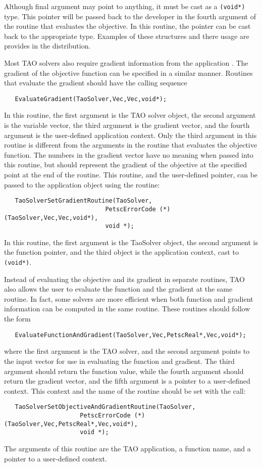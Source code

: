 Although final argument may point to anything, it must be cast as a {\tt (void*)} type.
This pointer will be passed back to the developer in the fourth argument of the
routine that evaluates the objective.  In this routine, the pointer can be cast
back to the appropriate type.  Examples of these structures and there usage
are provides in the distribution.


   Most TAO solvers also require gradient information from the 
application .
  The gradient of the objective function can be specified in a similar manner.
Routines that evaluate the gradient should have the calling sequence
\begin{verbatim}
   EvaluateGradient(TaoSolver,Vec,Vec,void*);
\end{verbatim}
\noindent
In this routine, the first
argument is the TAO solver object, the second argument is the variable
vector, the third argument is the gradient vector, and the fourth argument is
the user-defined application context.  Only the third argument in this
routine is different from the arguments in the routine that evaluates
the objective function.  The numbers in the gradient vector have no
meaning when passed into this routine, but should represent the gradient
of the objective at the specified point at the end of the routine.
This routine, and the user-defined pointer, can be passed to the application
object using the routine: 
\begin{verbatim}
   TaoSolverSetGradientRoutine(TaoSolver,
                            PetscErrorCode (*)(TaoSolver,Vec,Vec,void*),
                            void *);
\end{verbatim}
\noindent
In this routine, the first argument is the TaoSolver object, the second argument
is the function pointer, and the third object is the application context, cast
to {\tt (void*)}.

   Instead of evaluating the objective and its gradient in separate
routines, TAO also allows the user to evaluate the function and the gradient
at the same routine.  In fact, some solvers are more efficient when
both function and gradient information can be computed in the same routine.
These routines should follow the form
\begin{verbatim}
   EvaluateFunctionAndGradient(TaoSolver,Vec,PetscReal*,Vec,void*);
\end{verbatim}
\noindent
where the first
argument is the TAO solver, and the second
argument points to the input vector for use in evaluating the
function and gradient. The third argument should return the
function value, while the fourth argument should return the gradient vector,
and the fifth argument is a pointer to a user-defined context.
This context and the name of the routine should be set with the
call: 
\begin{verbatim}
   TaoSolverSetObjectiveAndGradientRoutine(TaoSolver,
                     PetscErrorCode (*)(TaoSolver,Vec,PetscReal*,Vec,void*),
                     void *);
\end{verbatim}
\noindent
The arguments of this routine are the TAO application, a
function name, and a pointer to a user-defined context.


